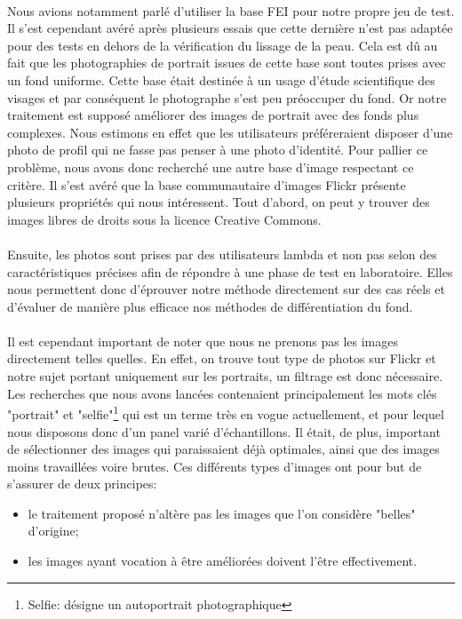 \documentclass[11pt, french]{report-rd-info}
\begin{document}
\paragraph*{}
Nous avions notamment parlé d'utiliser la base FEI pour notre propre jeu de test. Il s'est cependant avéré après plusieurs essais que cette dernière n'est pas adaptée pour des tests en dehors de la vérification du lissage de la peau. Cela est dû au fait que les photographies de portrait issues de cette base sont toutes prises avec un fond uniforme. Cette base était destinée à un usage d'étude scientifique des visages et par conséquent le photographe s'est peu préoccuper du fond. Or notre traitement est supposé améliorer des images de portrait avec des fonds plus complexes. Nous estimons en effet que les utilisateurs préféreraient disposer d'une photo de profil qui ne fasse pas penser à une photo d'identité.
Pour pallier ce problème, nous avons donc recherché une autre base d'image respectant ce critère.
Il s'est avéré que la base communautaire d'images Flickr présente plusieurs propriétés qui nous intéressent. Tout d'abord, on peut y trouver des images libres de droits sous la licence Creative Commons.
\paragraph*{}
Ensuite, les photos sont prises par des utilisateurs lambda et non pas selon des caractéristiques précises afin de répondre à une phase de test en laboratoire. Elles nous permettent donc d'éprouver notre méthode directement sur des cas réels et d'évaluer de manière plus efficace nos méthodes de différentiation du fond. 
\paragraph*{}
Il est cependant important de noter que nous ne prenons pas les images directement telles quelles. En effet, on trouve tout type de photos sur Flickr et notre sujet portant uniquement sur les portraits, un filtrage est donc nécessaire. Les recherches que nous avons lancées contenaient principalement les mots clés "portrait" et "selfie"\footnote{Selfie: désigne un autoportrait photographique} qui est un terme très en vogue actuellement, et pour lequel nous disposons donc d'un panel varié d'échantillons. Il était, de plus, important de sélectionner des images qui paraissaient déjà optimales, ainsi que des images moins travaillées voire brutes. Ces différents types d'images ont pour but de s'assurer de deux principes:
\begin{itemize}
\item le traitement proposé n'altère pas les images que l'on considère "belles" d'origine; 
\item les images ayant vocation à être améliorées doivent l'être effectivement.
\end{itemize}
\end{document}
